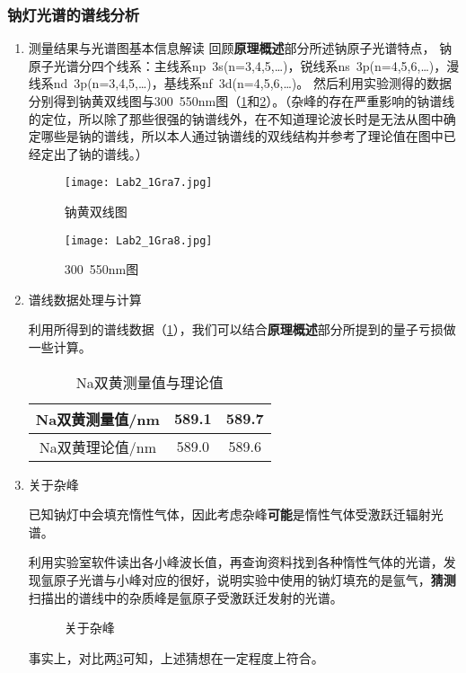 \documentclass[dvipsnames, svgnames,a4paper,11pt]{article}
\begin{document}
	\subsubsection{钠灯光谱的谱线分析}
	\begin{enumerate}
		\item 测量结果与光谱图基本信息解读
		回顾\textbf{原理概述}部分所述钠原子光谱特点，
		钠原子光谱分四个线系：主线系np~3s(n=3,4,5,…)，锐线系ns~3p(n=4,5,6,…)，漫线系nd~3p(n=3,4,5,…)，基线系nf~3d(n=4,5,6,…)。
		然后利用实验测得的数据分别得到钠黄双线图与300~550nm图（\cref{fig:fig7}和\cref{fig:fig8}）。（杂峰的存在严重影响的钠谱线的定位，所以除了那些很强的钠谱线外，在不知道理论波长时是无法从图中确定哪些是钠的谱线，所以本人通过钠谱线的双线结构并参考了理论值在图中已经定出了钠的谱线。）
		
		\begin{figure}[htbp]
			\centering
			\texttt{[image: Lab2\_1Gra7.jpg]}
			\caption{钠黄双线图}
			\label{fig:fig7}
		\end{figure}
		
		\begin{figure}[htbp]
			\centering
			\texttt{[image: Lab2\_1Gra8.jpg]}
			\caption{300~550nm图}
			\label{fig:fig8}
		\end{figure}
		
		\item 谱线数据处理与计算
		
		利用所得到的谱线数据（\cref{tab:tab1}），我们可以结合\textbf{原理概述}部分所提到的量子亏损做一些计算。
		
		\begin{table}[ht]
			\centering
			\begin{tabular}{|c|c|c|}
				\hline
				Na双黄测量值/nm & 589.1 & 589.7 \\
				\hline
				Na双黄理论值/nm & 589.0 & 589.6 \\
				\hline
			\end{tabular}
			\caption{Na双黄测量值与理论值}
			\label{tab:tab1}
		\end{table}		
		
		\item 关于杂峰
		
		已知钠灯中会填充惰性气体，因此考虑杂峰\textbf{可能}是惰性气体受激跃迁辐射光谱。
		
		利用实验室软件读出各小峰波长值，再查询资料找到各种惰性气体的光谱，发现氩原子光谱与小峰对应的很好，说明实验中使用的钠灯填充的是氩气，\textbf{猜测}扫描出的谱线中的杂质峰是氩原子受激跃迁发射的光谱。
		
		\begin{figure}[htbp]
			\centering
			\caption{关于杂峰}
			\label{fig:fig9}			
		\end{figure}
		
		事实上，对比两\cref{fig:fig9}可知，上述猜想在一定程度上符合。
		
	\end{enumerate}
	
\end{document}
